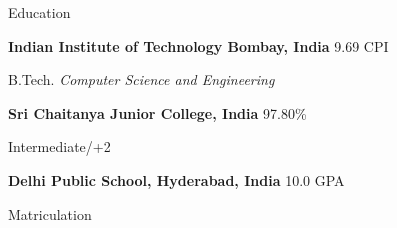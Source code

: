 \begin{rubric}{Education}

\entry*[2019 -- 2021*]%
	\textbf{Indian Institute of Technology Bombay, India} \hfill 9.69 CPI
	\par B.Tech. \emph{Computer Science and Engineering}


\entry*[2017 -- 2019]%
	\textbf{Sri Chaitanya Junior College, India} \hfill 97.80\% \par
	Intermediate/+2
	

\entry*[2010 -- 2017]%
	\textbf{Delhi Public School, Hyderabad, India} \hfill 10.0 GPA \par
	Matriculation
\end{rubric}